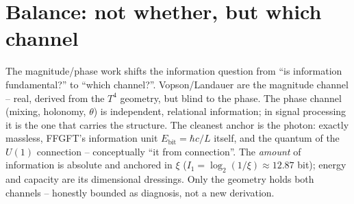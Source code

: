 \section{Balance: not whether, but which channel}
The magnitude/phase work shifts the information question from \enquote{is information fundamental?} to
\enquote{which channel?}. Vopson/Landauer are the magnitude channel -- real, derived from the $T^4$
geometry, but blind to the phase. The phase channel (mixing, holonomy, $\theta$) is independent,
relational information; in signal processing it is the one that carries the structure. The cleanest
anchor is the photon: exactly massless, FFGFT's information unit $E_\text{bit}=\hbar c/L$ itself, and the quantum of
the $U(1)$ connection -- conceptually \enquote{it from connection}. The \emph{amount} of information is
absolute and anchored in $\xi$ ($I_1=\log_2(1/\xi)\approx12.87$ bit); energy and capacity are its
dimensional dressings. Only the geometry holds both channels -- honestly bounded as diagnosis, not a new
derivation.

